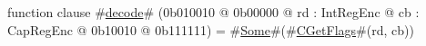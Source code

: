 function clause #\hyperref[zdecode]{decode}# (0b010010 @ 0b00000 @ rd : IntRegEnc @ cb : CapRegEnc @   0b10010 @ 0b111111) = #\hyperref[zSome]{Some}#(#\hyperref[zCGetFlags]{CGetFlags}#(rd, cb))
